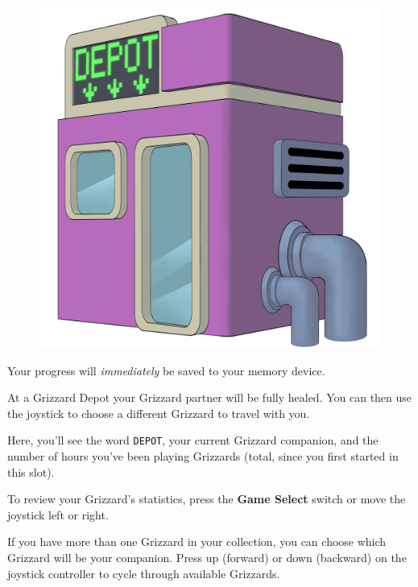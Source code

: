 \documentclass[10pt,twocolumn,openany,article]{memoir}
\begin{document}
\begin{figure}[b]
  \begin{center}
    \includegraphics[width=2\columnwidth]{../Manual/GrizzardDepot.png}
  \end{center}
\end{figure}

\ifdefined\NOSAVE\else
Your progress will \emph{immediately} be saved to your memory device.
\fi

At  a  Grizzard  Depot  your  Grizzard partner  will  be  fully  healed.
\ifdefined\DEMO\else You can then use the joystick to choose a different
Grizzard to travel with you. \fi

Here,  you'll  see  the   word  \texttt{DEPOT},  your  current  Grizzard
companion, and the number of hours you've been playing Grizzards (total,
since you first started in this slot).

To   review  your   Grizzard's   statistics,   press  the   \textbf{Game
  Select} switch or move the joystick left or right.

\ifdefined\DEMO\else
If you  have more than one  Grizzard in your collection,  you can choose
which  Grizzard will  be  your  companion. Press  up  (forward) or  down
(backward)  on  the  joystick  controller  to  cycle  through  available
Grizzards.
\fi
\end{document}
